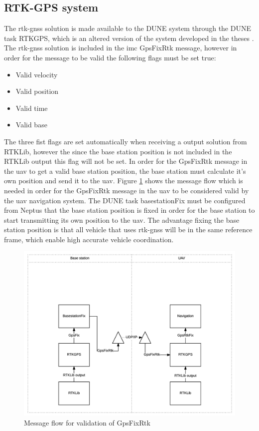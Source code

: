 \subsection{RTK-GPS system}\label{ss:RTK-GPS system}
The \gls{rtk-gnss} solution is made available to the DUNE system through the DUNE task RTKGPS, which is an altered version of the system developed in the theses \citep{Spockeli}. The \gls{rtk-gnss} solution is included in the \gls{imc} GpsFixRtk message, however in order for the message to be valid the following flags must be set true:
\begin{table}[H]
\begin{itemize}[noitemsep]
\item Valid velocity
\item Valid position
\item Valid time
\item Valid base
\end{itemize}
\end{table}
The three fist flags are set automatically when receiving a output solution from RTKLib, however the since the base station position is not included in the RTKLib output this flag will not be set. In order for the GpsFixRtk message in the \gls{uav} to get a valid base station position, the base station must calculate it's own position and send it to the \gls{uav}. Figure \ref{Fig:ValidationGpsFixRtk} shows the message flow which is needed in order for the GpsFixRtk message in the \gls{uav} to be considered valid by the \gls{uav} navigation system. The DUNE task basestationFix must be configured from Neptus that the base station position is fixed in order for the base station to start transmitting its own position to the \gls{uav}. The advantage fixing the base station position is that all vehicle that uses \gls{rtk-gnss} will be in the same reference frame, which enable high accurate vehicle coordination.
\begin{figure}[H]
\centering
\includegraphics[scale=0.7]{figs/ValidationGpsFixRtk.png}
\caption{Message flow for validation of GpsFixRtk}
\label{Fig:ValidationGpsFixRtk}
\end{figure}
